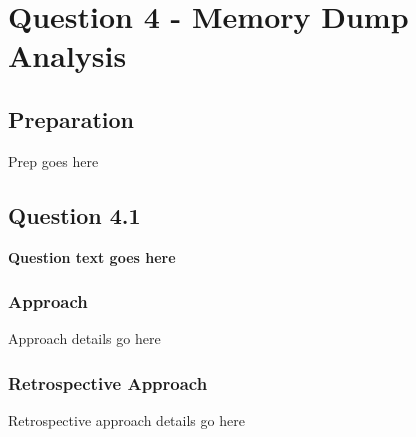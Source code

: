 \chapter{Question 4 - Memory Dump Analysis}

\section{Preparation}
Prep goes here

\section{Question 4.1}
\textbf{Question text goes here}
\subsection{Approach}
Approach details go here
\subsection{Retrospective Approach}
Retrospective approach details go here
